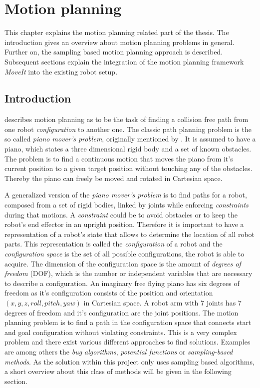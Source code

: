 
\chapter{Motion planning}
\label{chap:moveit}
This chapter explains the motion planning related part of the thesis. The introduction gives an overview about motion planning problems in general. Further on, the sampling based motion planning approach is described. Subsequent sections explain the integration of the motion planning framework \emph{MoveIt} into the existing robot setup.

\section{Introduction}

\citep[p. 1--11]{choset2005} describes motion planning as to be the task of finding a collision free path from one robot \emph{configuration} to another one. The classic path planning problem is the so called \emph{piano mover's problem}, originally mentioned by \cite{schwartz1983}. It is assumed to have a piano, which states a three dimensional rigid body and a set of known obstacles. The problem is to find a continuous motion that moves the piano from it's current position to a given target position without touching any of the obstacles. Thereby the piano can freely be moved and rotated in Cartesian space. 

A generalized version of the \emph{piano mover's problem} is to find paths for a robot, composed from a set of rigid bodies, linked by joints while enforcing \emph{constraints} during that motions. A \emph{constraint} could be to avoid obstacles or to keep the robot's end effector in an upright position. Therefore it is important to have a representation of a robot's state that allows to determine the location of all robot parts. This representation is called the \emph{configuration} of a robot and the \emph{configuration space} is the set of all possible configurations, the robot is able to acquire. The dimension of the configuration space is the amount of \emph{degrees of freedom} (DOF), which is the number or independent variables that are necessary to describe a configuration. An imaginary free flying piano has six degrees of freedom as it's configuration consists of the position and orientation $(x,y,z,roll,pitch,yaw)$ in Cartesian space. A robot arm with 7 joints has 7 degrees of freedom and it's configuration are the joint positions. The motion planning problem is to find a path in the configuration space that connects start and goal configuration without violating constraints. This is a very complex problem and there exist various different approaches to find solutions. Examples are among others the \emph{bug algorithms}\citep[chapter 2]{choset2005}, \emph{potential functions}\citep[chapter 4]{choset2005} or \emph{sampling-based methods}\citep[chapter 7]{choset2005}. As the solution within this project only uses sampling based algorithms, a short overview about this class of methods will be given in the following section.

